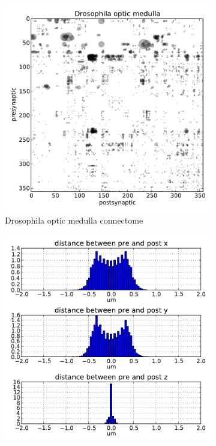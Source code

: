 \documentclass{article}
\begin{document}
\begin{figure}
  \centering 
  \begin{subfigure}[b]{0.55\textwidth}
    \includegraphics[width=\textwidth]{drosophila/adj_comp.pdf}
    \caption{Drosophila optic medulla connectome}
    \label{fig:drosophila:connectome}
  \end{subfigure}
  \begin{subfigure}[b]{0.4\textwidth}
    \includegraphics[width=\textwidth]{drosophila/pre_post_dist_hist.pdf}

\end{subfigure}
\end{figure}
\end{document}
